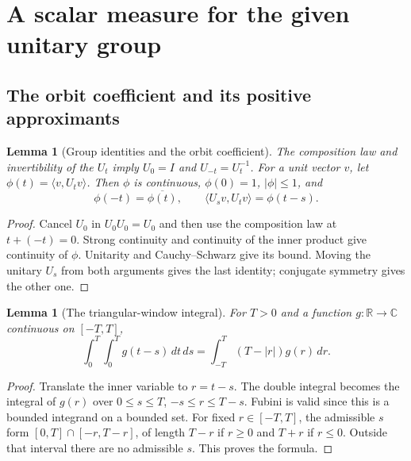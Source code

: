 \documentclass[reqno,a4paper,12pt]{amsart}
\newtheorem{lemma}[theorem]{Lemma}
\theoremstyle{definition}
\newcommand{\R}{\mathbb R}
\newcommand{\C}{\mathbb C}
\newcommand{\ip}[2]{\langle #1,#2\rangle}
\begin{document}
\clearpage
\section{A scalar measure for the given unitary group}
\subsection{The orbit coefficient and its positive approximants}
\begin{lemma}[Group identities and the orbit coefficient]\label{lem:group}
The composition law and invertibility of the $U_t$ imply
$U_0=I$ and $U_{-t}=U_t^{-1}$.
For a unit vector $v$, let $\phi(t)=\ip{v}{U_tv}$.
Then $\phi$ is continuous, $\phi(0)=1$, $|\phi|\le1$, and
\[
 \phi(-t)=\overline{\phi(t)},\qquad
 \ip{U_sv}{U_tv}=\phi(t-s).
\]
\end{lemma}
\begin{proof}
Cancel $U_0$ in $U_0U_0=U_0$ and then use the composition law at
$t+(-t)=0$. Strong continuity and continuity of the inner product
give continuity of $\phi$. Unitarity and Cauchy--Schwarz give its
bound. Moving the unitary $U_s$ from both arguments gives the last
identity; conjugate symmetry gives the other one.
\end{proof}

\begin{lemma}[The triangular-window integral]\label{lem:triangle-integral}
For $T>0$ and a function $g:\R\to\C$ continuous on $[-T,T]$,
\[
 \int_0^T\int_0^T g(t-s)\,dt\,ds
 =\int_{-T}^T(T-|r|)g(r)\,dr.
\]
\end{lemma}
\begin{proof}
Translate the inner variable to $r=t-s$. The double integral becomes
the integral of $g(r)$ over $0\le s\le T$, $-s\le r\le T-s$.
Fubini is valid since this is a bounded integrand on a bounded set.
For fixed $r\in[-T,T]$, the admissible $s$ form
$[0,T]\cap[-r,T-r]$, of length $T-r$ if $r\ge0$ and $T+r$ if $r\le0$.
Outside that interval there are no admissible $s$. This proves the formula.
\end{proof}
\end{document}
